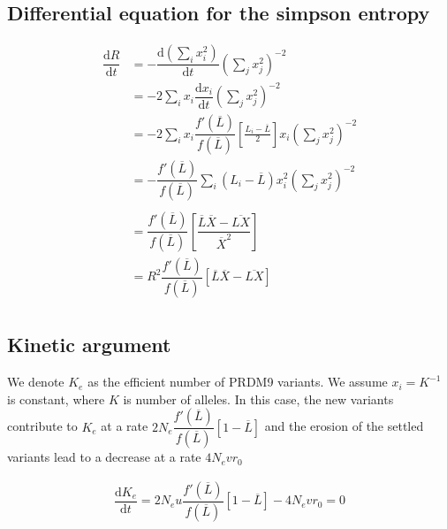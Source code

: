 \documentclass{article}
\begin{document}
\subsection{Differential equation for the simpson entropy}
\begin{equation}
  \begin{aligned}
    \dfrac{\mathrm{d} R }{\mathrm{d}t} &=
    - \dfrac{\mathrm{d} \left( \sum_i x_i^2  \right)}{\mathrm{d}t} \left( \sum_j x_j^2  \right)^{-2} \\
    &=
   - 2  \sum_i x_i \dfrac{\mathrm{d} x_i }{\mathrm{d}t} \left( \sum_j x_j^2  \right)^{-2} \\
    &=
    - 2  \sum_i x_i \dfrac{f'(\overline{L})}{f(\overline{L})} \left[ \tfrac{L_i - \overline{L}}{2} \right]x_i \left( \sum_j x_j^2  \right)^{-2} \\
    &=
    - \dfrac{f'(\overline{L})}{f(\overline{L})} \sum_i (L_i - \overline{L})  x_i^2 \left( \sum_j x_j^2  \right)^{-2} \\
     \\
      &=
     \dfrac{f'(\overline{L})}{f(\overline{L})} \left[ \dfrac{\overline{L} \overline{X} - \overline{L X}}{ \overline{X} ^{2}} \right] \\
     &=
     R^2 \dfrac{f'(\overline{L})}{f(\overline{L})} \left[ \overline{L} \overline{X} - \overline{L X} \right] \\
  \end{aligned}
\end{equation}

\subsection{Kinetic argument}

We denote $K_e$ as the efficient number of PRDM9 variants.  
We assume $x_i=K^{-1}$ is constant, where $K$ is number of alleles.  
In this case, the new variants contribute to $K_e$ at a rate $2 N_e \dfrac{f'(\overline{L})}{f(\overline{L})} [ 1 - \overline{L} ]$ and the erosion of the settled variants lead to a decrease at a rate $4 N_e v r_0$

\begin{equation}
  \begin{aligned}
    \dfrac{\mathrm{d} K_e }{\mathrm{d}t} =
    2 N_e u \dfrac{f'(\overline{L})}{f(\overline{L})} [ 1 - \overline{L} ] - 4 N_e v r_0 = 0 \\
  \end{aligned}
\end{equation}
\end{document}

